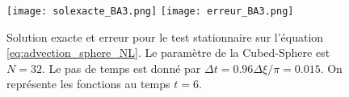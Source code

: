 \begin{figure}[htbp]
\begin{center}
\texttt{[image: solexacte\_BA3.png]}
\texttt{[image: erreur\_BA3.png]}
\end{center}
\caption{Solution exacte et erreur pour le test stationnaire sur l'équation \eqref{eq:advection_sphere_NL}. Le paramètre de la Cubed-Sphere est $N=32$. Le pas de temps est donné par $\Delta t = 0.96 \Delta \xi / \pi = 0.015$. On représente les fonctions au temps $t=6$.}
\label{fig:benartzi_test3_sol}
\end{figure}



















